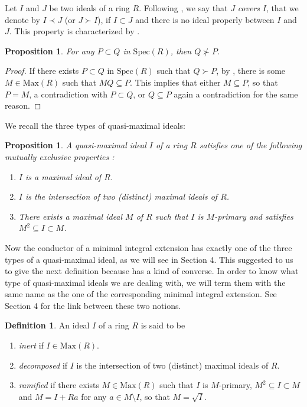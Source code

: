 \documentclass[12pt,leqno]{amsart}
\newtheorem{proposition}[theorem]{Proposition}
\theoremstyle{definition}
\newtheorem{definition}[theorem]{Definition}
\begin{document}
Let $I$ and $J$ be two ideals of a ring $R$. Following \cite[D\'efinition, p.10-02]{GU}, we say that $J$ {\it covers} $I$, that we denote by $I\prec J$ (or $J\succ I$), if $I\subset J$ and there is no ideal properly between $I$ and $J$. This property is characterized by \cite[Corollaries 1 and 2, p.237]{ZS}. 

\begin{proposition}\label{2.7} For any $P\subset Q$ in $\mathrm{Spec}(R)$, then  $Q\nsucc P$. 
\end{proposition}
\begin{proof} If  there exists $P\subset Q$ in $\mathrm{Spec}(R)$ such that $Q\succ P$, by \cite[Corollary 1, p.237]{ZS}, there is  some $M\in\mathrm{Max}(R)$ such that $MQ\subseteq P$. This implies that either $ M\subseteq P$, so that $P=M$, a contradiction with $P\subset Q$, or $Q\subseteq P$ again a contradiction for the same reason.
\end{proof}

We recall the three types of quasi-maximal ideals:
\begin{proposition}\label{2.70} \cite[Proposition 3]{AKKT} A quasi-maximal ideal $I$ of a ring $R$ satisfies one of the following mutually exclusive properties  :
\begin{enumerate}
\item $I$ is a maximal ideal of $R$.
\item $I$ is the intersection of two (distinct) maximal ideals of $R$.
\item There exists a maximal ideal $M$ of $R$ such that $I$ is $M$-primary and satisfies $M^2\subseteq I\subset M$.
\end{enumerate}
\end{proposition}

Now the conductor of a minimal integral extension has exactly one of the three types of a quasi-maximal ideal, as we will see in Section 4. This suggested to us to give the next definition because \cite[Proposition 3]{AKKT} has a kind of converse. In order to know what type of quasi-maximal ideals we are dealing with, we will term them with the same name as the one of the corresponding minimal integral extension. See Section 4 for the link between these two notions.

\begin{definition}\label{2.2} An ideal $I$ of a ring $R$ is said to be 
\begin{enumerate}
\item {\it inert} if $I\in\mathrm{Max}(R)$.
\item {\it decomposed} if $I$ is the intersection of two (distinct) maximal ideals of $R$.
\item {\it ramified} if there exists $M\in\mathrm{Max}(R)$ such that $I$ is $ M$-primary, $M^2\subseteq I\subset M$ and $M=I+Ra$ for any $a\in M\setminus I$, so that $M=\sqrt I$.
\end{enumerate}
\end{definition}
\end{document}
